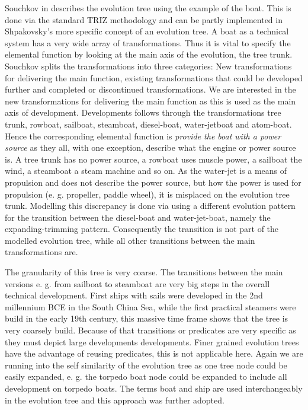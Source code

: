 \documentclass[11pt,a4paper]{article}
\begin{document}
Souchkov in \cite{KS} describes the evolution tree using the example of the boat. This is done via the standard TRIZ methodology and can be partly implemented in Shpakovsky's more specific concept of an evolution tree. A boat as a technical system has a very wide array of transformations. Thus it is vital to specify the elemental function by looking at the main axis of the evolution, the tree trunk.
Souchkov splits the transformations into three categories: New transformations for delivering the main function, existing transformations that could be developed further and completed or discontinued transformations. We are interested in the new transformations for delivering the main function as this is used as the main axis of development. Developments follows through the transformations tree trunk, rowboat, sailboat, steamboat, diesel-boat, water-jetboat and atom-boat. Hence the corresponding elemental function is \textit{provide the boat with a power source} as they all, with one exception, describe what the engine or power source is. A tree trunk has no power source, a rowboat uses muscle power, a sailboat the wind, a steamboat a steam machine and so on. As the water-jet is a means of propulsion and does not describe the power source, but how the power is used for propulsion (e. g. propeller, paddle wheel), it is misplaced on the evolution tree trunk.
Modelling this discrepancy is done via using a different evolution pattern for the transition between the diesel-boat and water-jet-boat, namely the expanding-trimming pattern. Consequently the transition is not part of the modelled evolution tree, while all other transitions between the main transformations are.


The granularity of this tree is very coarse. The transitions between the main versions e. g. from sailboat to steamboat are very big steps in the overall technical development. First ships with sails were developed in the 2nd millennium BCE in the South China Sea, while the first practical steamers were build in the early 19th century, this massive time frame shows that the tree is very coarsely build. Because of that transitions or predicates are very specific as they must depict large developments developments. Finer grained evolution trees have the advantage of reusing predicates, this is not applicable here. Again we are running into the self similarity of the evolution tree as one tree node could be easily expanded, e. g. the torpedo boat node could be expanded to include all development on torpedo boats.
The terms boat and ship are used interchangeably in the evolution tree and this approach was further adopted. 
\end{document}
